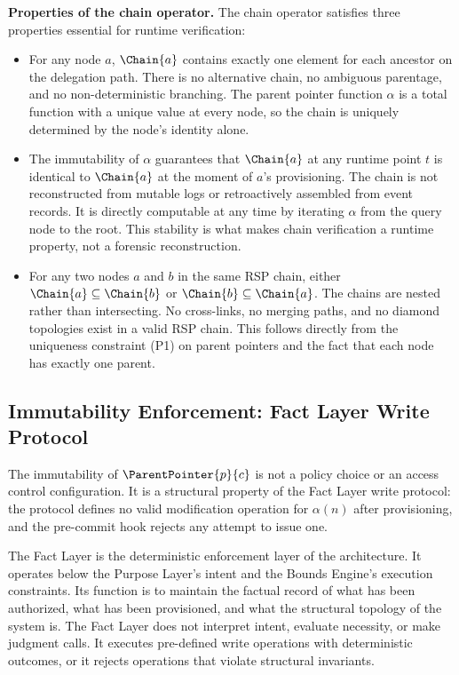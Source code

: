 \bigskip
\noindent\textbf{Properties of the chain operator.} The chain operator satisfies three properties essential for runtime verification:

\begin{itemize}
    \item[(C1) \textbf{Determinism}] For any node $a$, $\Chain{a}$ contains exactly one element for each ancestor on the delegation path. There is no alternative chain, no ambiguous parentage, and no non-deterministic branching. The parent pointer function $\alpha$ is a total function with a unique value at every node, so the chain is uniquely determined by the node's identity alone.

    \item[(C2) \textbf{Stability}] The immutability of $\alpha$ guarantees that $\Chain{a}$ at any runtime point $t$ is identical to $\Chain{a}$ at the moment of $a$'s provisioning. The chain is not reconstructed from mutable logs or retroactively assembled from event records. It is directly computable at any time by iterating $\alpha$ from the query node to the root. This stability is what makes chain verification a runtime property, not a forensic reconstruction.

    \item[(C3) \textbf{Nestedness}] For any two nodes $a$ and $b$ in the same RSP chain, either $\Chain{a} \subseteq \Chain{b}$ or $\Chain{b} \subseteq \Chain{a}$. The chains are nested rather than intersecting. No cross-links, no merging paths, and no diamond topologies exist in a valid RSP chain. This follows directly from the uniqueness constraint (P1) on parent pointers and the fact that each node has exactly one parent.
\end{itemize}

\subsection{Immutability Enforcement: Fact Layer Write Protocol}
\label{sec:fact-layer-immutability}

The immutability of $\ParentPointer{p}{c}$ is not a policy choice or an access control configuration. It is a structural property of the Fact Layer write protocol: the protocol defines no valid modification operation for $\alpha(n)$ after provisioning, and the pre-commit hook rejects any attempt to issue one.

The Fact Layer is the deterministic enforcement layer of the \bxthree{} architecture. It operates below the Purpose Layer's intent and the Bounds Engine's execution constraints. Its function is to maintain the factual record of what has been authorized, what has been provisioned, and what the structural topology of the system is. The Fact Layer does not interpret intent, evaluate necessity, or make judgment calls. It executes pre-defined write operations with deterministic outcomes, or it rejects operations that violate structural invariants.

